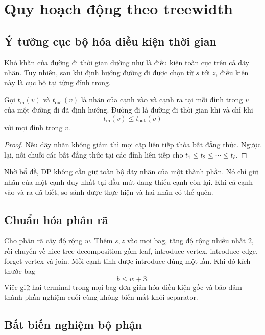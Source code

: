 \chapter{Quy hoạch động theo treewidth}
\label{chap:treewidth}

\section{Ý tưởng cục bộ hóa điều kiện thời gian}

Khó khăn của đường đi thời gian dường như là điều kiện toàn cục trên cả dãy nhãn. Tuy nhiên, sau khi định hướng đường đi được chọn từ $s$ tới $z$, điều kiện này là cục bộ tại từng đỉnh trong.

\begin{lemma}
Gọi $t_{\mathrm{in}}(v)$ và $t_{\mathrm{out}}(v)$ là nhãn của cạnh vào và cạnh ra tại mỗi đỉnh trong $v$ của một đường đi đã định hướng. Đường đi là đường đi thời gian khi và chỉ khi
\[
  t_{\mathrm{in}}(v)\le t_{\mathrm{out}}(v)
\]
với mọi đỉnh trong $v$.
\end{lemma}

\begin{proof}
Nếu dãy nhãn không giảm thì mọi cặp liên tiếp thỏa bất đẳng thức. Ngược lại, nối chuỗi các bất đẳng thức tại các đỉnh liên tiếp cho $t_1\le t_2\le\cdots\le t_\ell$.
\end{proof}

Nhờ bổ đề, DP không cần giữ toàn bộ dãy nhãn của một thành phần. Nó chỉ giữ nhãn của một cạnh duy nhất tại đầu mút đang thiếu cạnh còn lại. Khi cả cạnh vào và ra đã biết, so sánh được thực hiện và hai nhãn có thể quên.

\section{Chuẩn hóa phân rã}

Cho phân rã cây độ rộng $w$. Thêm $s,z$ vào mọi bag, tăng độ rộng nhiều nhất $2$, rồi chuyển về nice tree decomposition gồm leaf, introduce-vertex, introduce-edge, forget-vertex và join. Mỗi cạnh tĩnh được introduce đúng một lần. Khi đó kích thước bag
\[
  b\le w+3.
\]
Việc giữ hai terminal trong mọi bag đơn giản hóa điều kiện gốc và bảo đảm thành phần nghiệm cuối cùng không biến mất khỏi separator.

\section{Bất biến nghiệm bộ phận}

